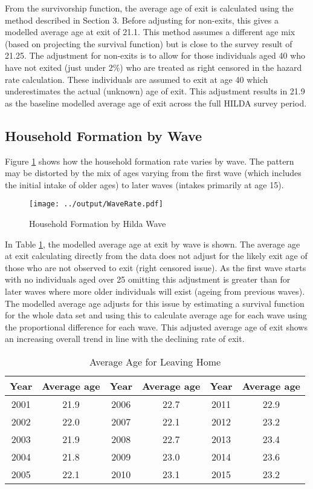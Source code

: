 \documentclass[12pt]{article}
\begin{document}
From the survivorship function, the average age of exit is calculated using the method described in Section 3. Before adjusting for non-exits, this gives a modelled average age at exit of 21.1. This method assumes a different age mix (based on projecting the survival function) but is close to the survey result of 21.25. The adjustment for non-exits is to allow for those individuals aged 40 who have not exited (just under 2\%) who are treated as right censored in the hazard rate calculation. These individuals are assumed to exit at age 40 which underestimates the actual (unknown) age of exit. This adjustment results in 21.9 as the baseline modelled average age of exit across the full HILDA survey period.

\subsection{Household Formation by Wave}

Figure \ref{ExitbyWave} shows how the household formation rate varies by wave. The pattern may be distorted by the mix of ages varying from the first wave (which includes the initial intake of older ages) to later waves (intakes primarily at age 15).

\begin{figure}[htpb]
  \caption{Household Formation by Hilda Wave}
  \label{ExitbyWave}
  \centering
  \texttt{[image: ../output/WaveRate.pdf]}
\end{figure}

In Table \ref{rate1}, the modelled average age at exit by wave is shown. The average age at exit calculating directly from the data does not adjust for the likely exit age of those who are not observed to exit (right censored issue). As the first wave starts with no individuals aged over 25 omitting this adjustment is greater than for later waves where more older individuals will exist (ageing from previous waves). The modelled average age adjusts for this issue by estimating a survival function for the whole data set and using this to calculate average age for each wave using the proportional difference for each wave. This adjusted average age of exit shows an increasing overall trend in line with the declining rate of exit.

\begin{table}[htpb]
  \centering
  \caption{Average Age for Leaving Home}
  \label{rate1}
\begin{tabular}{@{}cccccc@{}}
\toprule
Year & Average age & Year & Average age & Year & Average age\tabularnewline
\midrule
2001 & 21.9 & 2006 & 22.7 & 2011 & 22.9 \tabularnewline
2002 & 22.0 & 2007 & 22.1 & 2012 & 23.2 \tabularnewline
2003 & 21.9 & 2008 & 22.7 & 2013 & 23.4 \tabularnewline
2004 & 21.8 & 2009 & 23.0 & 2014 & 23.6 \tabularnewline
2005 & 22.1 & 2010 & 23.1 & 2015 & 23.2 \tabularnewline
\bottomrule
\end{tabular}
\end{table}
\end{document}
